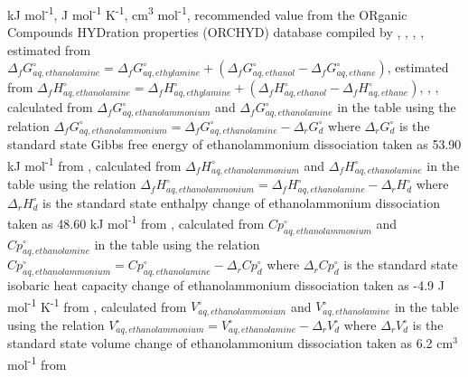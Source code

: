 \begin{table}
\begin{threeparttable}
  \begin{tablenotes}
     kJ mol\textsuperscript{-1},
     J mol\textsuperscript{-1} K\textsuperscript{-1},
     cm\textsuperscript{3} mol\textsuperscript{-1},
     recommended value from the ORganic Compounds HYDration properties (ORCHYD) database compiled by \cite{plyasunova2004database},
     \cite{ben1984solvation},
     \cite{pliego2000new},
     \cite{shock1990calculation},
     estimated from $\Delta_{f}G^{\circ}_{aq, ethanolamine} = \Delta_{f}G^{\circ}_{aq, ethylamine} + (\Delta_{f}G^{\circ}_{aq, ethanol} - \Delta_{f}G^{\circ}_{aq, ethane})$,
     estimated from $\Delta_{f}H^{\circ}_{aq, ethanolamine} = \Delta_{f}H^{\circ}_{aq, ethylamine} + (\Delta_{f}H^{\circ}_{aq, ethanol} - \Delta_{f}H^{\circ}_{aq, ethane})$,
     \cite{cabani1981group},
     \cite{maham1994densities},
     calculated from $\Delta_{f}G^{\circ}_{aq, ethanolammonium}$ and  $\Delta_{f}G^{\circ}_{aq, ethanolamine}$ in the table using the relation $\Delta_{f}G^{\circ}_{aq, ethanolammonium} = \Delta_{f}G^{\circ}_{aq, ethanolamine} - \Delta_{r}G^{\circ}_{d}$ where $\Delta_{r}G^{\circ}_{d}$ is the standard state Gibbs free energy of ethanolammonium dissociation taken as 53.90 kJ mol\textsuperscript{-1} from \cite{hamborg2009dissociation},
     calculated from $\Delta_{f}H^{\circ}_{aq, ethanolammonium}$ and  $\Delta_{f}H^{\circ}_{aq, ethanolamine}$ in the table using the relation $\Delta_{f}H^{\circ}_{aq, ethanolammonium} = \Delta_{f}H^{\circ}_{aq, ethanolamine} - \Delta_{r}H^{\circ}_{d}$ where $\Delta_{r}H^{\circ}_{d}$ is the standard state enthalpy change of ethanolammonium dissociation taken as 48.60 kJ mol\textsuperscript{-1} from \cite{hamborg2009dissociation},
     calculated from $Cp^{\circ}_{aq, ethanolammonium}$ and $Cp^{\circ}_{aq, ethanolamine}$ in the table using the relation $Cp^{\circ}_{aq, ethanolammonium} = Cp^{\circ}_{aq, ethanolamine} - \Delta_{r}Cp^{\circ}_{d}$ where $\Delta_{r}Cp^{\circ}_{d}$ is the standard state isobaric heat capacity change of ethanolammonium dissociation taken as -4.9 J mol\textsuperscript{-1} K\textsuperscript{-1} from \cite{bates1951acidic},
     calculated from $V^{\circ}_{aq, ethanolammonium}$ and $V^{\circ}_{aq, ethanolamine}$ in the table using the relation $V^{\circ}_{aq, ethanolammonium} = V^{\circ}_{aq, ethanolamine} - \Delta_{r}V^{\circ}_{d}$ where $\Delta_{r}V^{\circ}_{d}$ is the standard state volume change of ethanolammonium dissociation taken as 6.2 cm$^3$ mol\textsuperscript{-1} from \cite{cabani1977volume}
        
  \end{tablenotes}
  
  \label{tab:misc_prop}
  \end{threeparttable}
\end{table}
